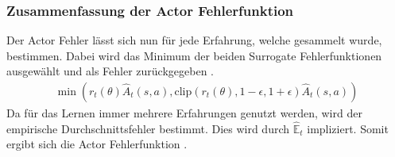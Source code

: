 \subsubsection{Zusammenfassung der Actor Fehlerfunktion} \label{subsubsec:Grundlagen_PPO_Actor_Loss}
Der Actor Fehler lässt sich nun für jede Erfahrung, welche gesammelt wurde, bestimmen. Dabei wird das Minimum der beiden Surrogate Fehlerfunktionen ausgewählt und als Fehler zurückgegeben .
\begin{align}
	\min(r_{t}(\theta) \hat{A}_{t}(s, a), \text{clip}(r_{t}(\theta), 1 - \epsilon, 1 + \epsilon) \hat{A}_{t}(s, a))
	\label{eq:Grundlagen_Actor_Loss_Single}
\end{align}
Da für das Lernen immer mehrere Erfahrungen genutzt werden, wird der empirische Durchschnittsfehler bestimmt. Dies wird durch $\mathbb{\hat{E}}_{t}$ impliziert. Somit ergibt sich die Actor Fehlerfunktion . \citep[S. 3f.]{PPO}\\

